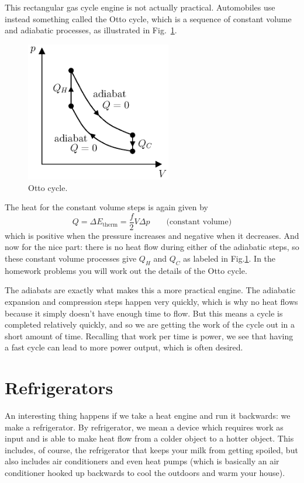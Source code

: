 This rectangular gas cycle engine is not actually practical.  Automobiles
use instead something called the Otto cycle, which is a sequence of
constant volume and adiabatic processes, as illustrated in
Fig.~\ref{fig:otto_cycle}.

\begin{figure}
\begin{center}
\includegraphics[width=2.5in]{heat_engines/otto_cycle.eps}
\caption{Otto cycle.}
\label{fig:otto_cycle}
\end{center}
\end{figure}

The heat for the constant volume steps is again given by
\begin{equation}
Q = \Delta E_\text{therm} = \frac{f}{2}V\Delta p \qquad\text{(constant
  volume)}
\end{equation}
which is positive when the pressure increases and negative when it
decreases.  And now for the nice part: there is no heat flow during
either of the adiabatic steps, so these constant volume processes give
$Q_H$ and $Q_C$ as labeled in Fig.\ref{fig:otto_cycle}.  In the
homework problems you will work out the details of the Otto cycle.

The adiabats are exactly what makes this a more practical engine.
The adiabatic expansion and compression steps happen very quickly,
which is why no heat flows because it simply doesn't have enough time
to flow.  But this means a cycle is completed relatively quickly, and
so we are getting the work of the cycle out in a short amount of
time.  Recalling that work per time is power, we see that having a
fast cycle can lead to more power output, which is often desired.

\section{Refrigerators}

An interesting thing happens if we take a heat engine and run it
backwards: we make a refrigerator.  By refrigerator, we mean a device
which requires work as input and is able to make heat flow from a
colder object to a hotter object.  This includes, of course, the
refrigerator that keeps your milk from getting spoiled, but also
includes air conditioners and even heat pumps (which is basically an
air conditioner hooked up backwards to cool the outdoors and warm
your house).

